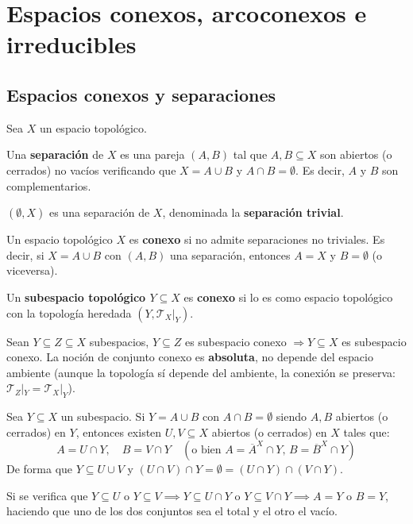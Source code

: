 \chapter{Espacios conexos, arcoconexos e irreducibles} \justifying
\section{Espacios conexos y separaciones}

Sea $X$ un espacio topológico.

\begin{defi}
Una \textbf{separación} de $X$ es una pareja $(A, B)$ tal que $A, B \subseteq X$ son abiertos (o cerrados) no vacíos verificando que $X = A \cup B$ y $A \cap B = \emptyset$. Es decir, $A$ y $B$ son complementarios.
\end{defi}

\begin{ejem}
$(\emptyset, X)$ es una separación de $X$, denominada la \textbf{separación trivial}.
\end{ejem}

\begin{defi}
Un espacio topológico $X$ es \textbf{conexo} si no admite separaciones no triviales. Es decir, si $X = A \cup B$ con $(A, B)$ una separación, entonces $A = X$ y $B = \emptyset$ (o viceversa).
\end{defi}

\begin{defi}
Un \textbf{subespacio topológico $Y \subseteq X$} es \textbf{conexo} si lo es como espacio topológico con la topología heredada $(Y, \mathcal{T}_X|_Y)$.
\end{defi}

\begin{obs}
Sean $Y \subseteq Z \subseteq X$ subespacios, $Y \subseteq Z$ es subespacio conexo $\Rightarrow Y \subseteq X$ es subespacio conexo. La noción de conjunto conexo es \textbf{absoluta}, no depende del espacio ambiente (aunque la topología sí depende del ambiente, la conexi\'on se preserva: $\mathcal{T}_Z|_Y = \mathcal{T}_X|_Y$).
\end{obs}

\begin{prop}
Sea $Y \subseteq X$ un subespacio. Si $Y = A \cup B$ con $A \cap B = \emptyset$ siendo $A, B$ abiertos (o cerrados) en $Y$, entonces existen $U, V \subseteq X$ abiertos (o cerrados) en $X$ tales que:
\[
A = U \cap Y, \quad B = V \cap Y \quad (\text{o bien } A = \overline{A}^X \cap Y, \, B = \overline{B}^X \cap Y)
\]
De forma que $Y \subseteq U \cup V$ y $(U \cap V) \cap Y = \emptyset = (U \cap Y) \cap (V \cap Y)$.

Si se verifica que $Y \subseteq U$ o $Y \subseteq V \implies Y \subseteq U \cap Y$ o $Y \subseteq V \cap Y \implies A = Y$ o $B = Y$, haciendo que uno de los dos conjuntos sea el total y el otro el vacío.
\end{prop}

